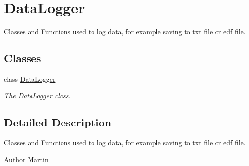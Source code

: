 \hypertarget{group__DataLogger}{}\section{Data\+Logger}
\label{group__DataLogger}


Classes and Functions used to log data, for example saving to txt file or edf file.  


\subsection*{Classes}
\begin{DoxyCompactItemize}
\item 
class \hyperlink{classDataLogger}{Data\+Logger}
\begin{DoxyCompactList}\small\item\em The \hyperlink{classDataLogger}{Data\+Logger} class. \end{DoxyCompactList}\end{DoxyCompactItemize}


\subsection{Detailed Description}
Classes and Functions used to log data, for example saving to txt file or edf file. 

\begin{DoxyAuthor}{Author}
Martin 
\end{DoxyAuthor}
